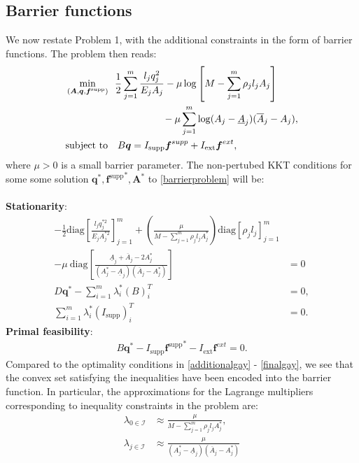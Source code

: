 \documentclass[10pt,a4paper]{article}
\begin{document}
\subsection{Barrier functions}
We now restate Problem 1, with the additional constraints in the form of barrier functions. The problem then reads:
\begin{align}\label{barrierproblem}
&\min_{(\boldsymbol{A},\boldsymbol{q},\boldsymbol{f}^\text{supp})} \enspace \frac{1}{2}\sum_{j=1}^m
\frac{l_j q_j^2}{E_j A_j} - \mu \log \left[ M - \sum_{j=1}^m \rho_j l_j A_j \right] \\
\nonumber & \hspace{35 mm} - \mu \sum_{j=1}^m \log (A_j-\underline{A}_j)(\overline{A}_j-A_j),\\
&\text{subject to} \quad B\boldsymbol{q} = I_\text{supp}\boldsymbol{f}^{supp}+I_\text{ext}\boldsymbol{f}^{ext}\nonumber,
\end{align}
where $\mu > 0 $ is a small barrier parameter.
\newpage
\noindent
The non-pertubed KKT conditions for some some solution $\boldsymbol{q}^*,{\boldsymbol{f}^\text{supp}}^*,\boldsymbol{A}^*$ to \eqref{barrierproblem} will be:
\\\\
\textbf{Stationarity}:
\begin{align}
-\frac{1}{2}\text{diag}\left[ \frac{l_j q_j^{*2}}{E_j A_j^{*2}}\right]_{j=1}^m + \left(\frac{\mu}{M-\sum_{j=1}^m \rho_j l_j A_j^*}\right) \text{diag}\left[ \rho_j l_j \right]_{j=1}^m \\
-\mu \ \text{diag}\left[\frac{\underline{A}_j+\overline{A}_j-2A_j^*}{(A_j^*-\underline{A}_j)(\overline{A}_j-A_j^*)}\right]&=0 \nonumber\\
D\boldsymbol{q}^* - \sum_{i=1}^m \lambda_i^*(B)_i^T &= 0,\\
\sum_{i=1}^m \lambda_i^*(I_\text{supp})_i^T &= 0.
\end{align}
\textbf{Primal feasibility}:
\begin{align}
B\boldsymbol{q}^*-I_\text{supp}{\boldsymbol{f}^\text{supp}}^*-I_\text{ext}\boldsymbol{f}^{ext}=0.
\end{align}
Compared to the optimality conditions in \eqref{additionalgay} - \eqref{finalgay}, we see that the convex set satisfying the inequalities have been encoded into the barrier function. In particular, the approximations for the Lagrange multipliers corresponding to inequality constraints in the problem are:
\begin{align}
\lambda_{0\in\mathcal{I}} &\approx \frac{\mu}{M-\sum_{j=1}^m \rho_j l_j A_j^*},\\
\lambda_{j\in\mathcal{I}} &\approx \frac{\mu}{(A_j^*-\underline{A}_j)(\overline{A}_j-A_j^*)}
\end{align}
\end{document}
